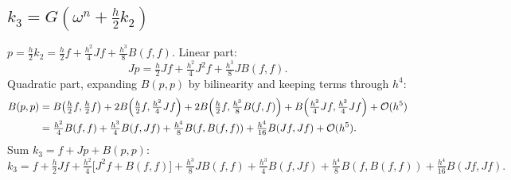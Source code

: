 \documentclass[11pt]{article}
\newcommand{\bO}{\mathcal{O}}
\begin{document}
\subsection{$k_3=G(\omega^n+\tfrac h2 k_2)$}
$p=\tfrac h2 k_2=\tfrac h2 f+\tfrac{h^2}{4}Jf+\tfrac{h^3}{8}B(f,f)$. Linear part:
\begin{equation}
  Jp = \tfrac h2 Jf + \tfrac{h^2}{4}J^2f + \tfrac{h^3}{8}JB(f,f).
\end{equation}
Quadratic part, expanding $B(p,p)$ by bilinearity and keeping terms through $h^4$:
\begin{align}
  B(p,p) &= B\!\left(\tfrac h2 f,\tfrac h2 f\right)
     + 2B\!\left(\tfrac h2 f,\tfrac{h^2}{4}Jf\right)
     + 2B\!\left(\tfrac h2 f,\tfrac{h^3}{8}B(f,f)\right)
     + B\!\left(\tfrac{h^2}{4}Jf,\tfrac{h^2}{4}Jf\right) + \bO(h^5)\notag\\
   &= \tfrac{h^2}{4}B(f,f) + \tfrac{h^3}{4}B(f,Jf)
     + \tfrac{h^4}{8}B(f,B(f,f)) + \tfrac{h^4}{16}B(Jf,Jf) + \bO(h^5).
\end{align}
Sum $k_3=f+Jp+B(p,p)$:
\begin{equation}
  k_3 = f + \tfrac h2 Jf + \tfrac{h^2}{4}\bigl[J^2f+B(f,f)\bigr]
      + \tfrac{h^3}{8}JB(f,f) + \tfrac{h^3}{4}B(f,Jf)
      + \tfrac{h^4}{8}B(f,B(f,f)) + \tfrac{h^4}{16}B(Jf,Jf).
\end{equation}
\end{document}
